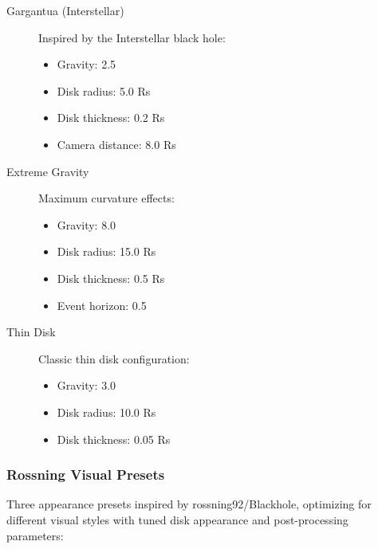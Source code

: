 \documentclass[12pt,a4paper]{article}
\theoremstyle{definition}
\theoremstyle{remark}
\begin{document}
\begin{description}
    \item[Gargantua (Interstellar)] Inspired by the Interstellar black hole:
        \begin{itemize}
            \item Gravity: 2.5
            \item Disk radius: 5.0 Rs
            \item Disk thickness: 0.2 Rs
            \item Camera distance: 8.0 Rs
        \end{itemize}
    
    \item[Extreme Gravity] Maximum curvature effects:
        \begin{itemize}
            \item Gravity: 8.0
            \item Disk radius: 15.0 Rs
            \item Disk thickness: 0.5 Rs
            \item Event horizon: 0.5
        \end{itemize}
    
    \item[Thin Disk] Classic thin disk configuration:
        \begin{itemize}
            \item Gravity: 3.0
            \item Disk radius: 10.0 Rs
            \item Disk thickness: 0.05 Rs
        \end{itemize}
\end{description}

\subsubsection{Rossning Visual Presets}

Three appearance presets inspired by rossning92/Blackhole, optimizing for different visual styles with tuned disk appearance and post-processing parameters:
\end{document}
